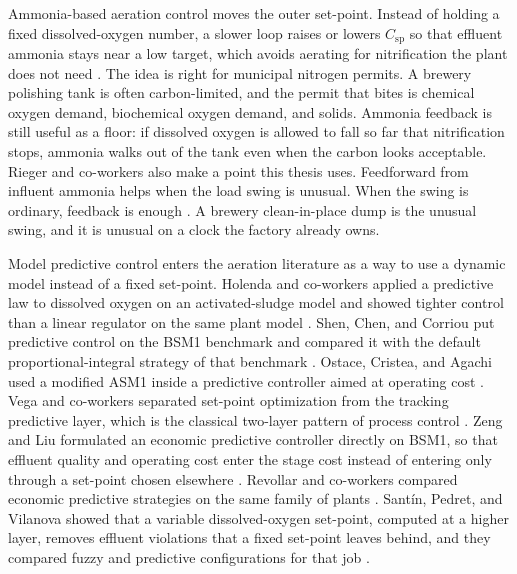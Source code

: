 Ammonia-based aeration control moves the outer set-point. Instead of holding a fixed dissolved-oxygen number, a slower loop raises or lowers $C_{\mathrm{sp}}$ so that effluent ammonia stays near a low target, which avoids aerating for nitrification the plant does not need \cite{rieger2014abac,amand2012optimal,samuelsson2007}. The idea is right for municipal nitrogen permits. A brewery polishing tank is often carbon-limited, and the permit that bites is chemical oxygen demand, biochemical oxygen demand, and solids. Ammonia feedback is still useful as a floor: if dissolved oxygen is allowed to fall so far that nitrification stops, ammonia walks out of the tank even when the carbon looks acceptable. Rieger and co-workers also make a point this thesis uses. Feedforward from influent ammonia helps when the load swing is unusual. When the swing is ordinary, feedback is enough \cite{rieger2014abac}. A brewery clean-in-place dump is the unusual swing, and it is unusual on a clock the factory already owns.

Model predictive control enters the aeration literature as a way to use a dynamic model instead of a fixed set-point. Holenda and co-workers applied a predictive law to dissolved oxygen on an activated-sludge model and showed tighter control than a linear regulator on the same plant model \cite{holenda2008}. Shen, Chen, and Corriou put predictive control on the BSM1 benchmark and compared it with the default proportional-integral strategy of that benchmark \cite{shen2008,copp2002cost,jeppsson2004cost}. Ostace, Cristea, and Agachi used a modified ASM1 inside a predictive controller aimed at operating cost \cite{ostace2011,henze1987asm1,henze2000asm}. Vega and co-workers separated set-point optimization from the tracking predictive layer, which is the classical two-layer pattern of process control \cite{vega2014,engell2007,darby2011rto}. Zeng and Liu formulated an economic predictive controller directly on BSM1, so that effluent quality and operating cost enter the stage cost instead of entering only through a set-point chosen elsewhere \cite{zeng2015empc,ellis2014empc}. Revollar and co-workers compared economic predictive strategies on the same family of plants \cite{revollar2017}. Sant{\'i}n, Pedret, and Vilanova showed that a variable dissolved-oxygen set-point, computed at a higher layer, removes effluent violations that a fixed set-point leaves behind, and they compared fuzzy and predictive configurations for that job \cite{santin2015jpc,santin2015iecr}.

